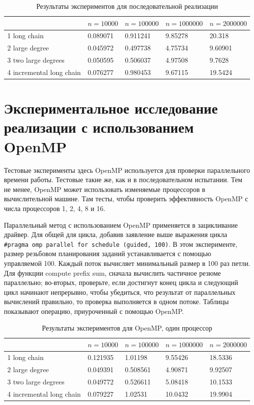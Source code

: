 \documentclass[specification,annotation]{itmo-student-thesis}
\newcommand{\revise}[1]{{\color{red!70!black} #1 }}
\begin{document}
\begin{table}[!ht]
\centering
\begin{tabular}{|l|l|l|l|l|}\hline
 & $n=10000$ & $n=100000$ & $n=1000000$ & $n=2000000$ \\\hline
1 long chain & 0.089071 & 0.911241 & 9.85278 & 20.318 \\\hline
2 large degree & 0.045972 & 0.497738 & 4.75734 & 9.60901 \\\hline
3 two large degrees & 0.050595 & 0.506037 & 4.97508 & 9.7628 \\\hline
4 incremental long chain & 0.076277 & 0.980453 & 9.67115 & 19.5424 \\\hline
\end{tabular}
\caption{Результаты экспериментов для последовательной реализации}\label{tbl:results-seq}
\end{table}

\section{Экспериментальное исследование реализации с использованием OpenMP}

\revise{
Тестовые эксперименты здесь OpenMP используется для проверки параллельного времени работы. Тестовые такие же, как и в последовательном испытании. Тем не менее, OpenMP может использовать изменяемые 
процессоров в вычислительной машине. Там тесты, чтобы проверить эффективность OpenMP с числа процессоров 1, 2, 4, 8 и 16.
}

\revise{
Параллельный метод с использованием OpenMP применяется в зацикливание драйвер. Для общей для цикла, добавив заявление выше выражения цикла 
\texttt{\#pragma omp parallel for schedule (guided, 100)}. В этом 
эксперименте, размер резьбовом планирования заданий устанавливается с помощью управляемой 100. Каждый поток вычисляет минимальный размер в 100 раз петли. Для функции compute prefix sum, сначала вычислить 
частичное резюме параллельно; во-вторых, проверьте, если достигнут конец цикла и следующий цикл начинают непрерывно, чтобы убедиться, что результат от параллельных вычислений правильно, то проверка 
выполняется в одном потоке. Таблицы показывают операцию, приуроченный с помощью OpenMP.
}

\begin{table}[!ht]
\centering
\begin{tabular}{|l|l|l|l|l|}\hline
 & $n=10000$ & $n=100000$ & $n=1000000$ & $n=2000000$ \\\hline
1 long chain & 0.121935 & 1.01198 & 9.55426 & 18.5336 \\\hline
2 large degree & 0.049391 & 0.508561 & 4.90871 & 9.92507 \\\hline
3 two large degrees & 0.049772 & 0.526611 & 5.08418 & 10.1533 \\\hline
4 incremental long chain & 0.079227 & 1.02531 & 10.0432 & 19.9904 \\\hline
\end{tabular}
\caption{Результаты экспериментов для OpenMP, один процессор}\label{tbl:results-openmp-1}
\end{table}
\end{document}
